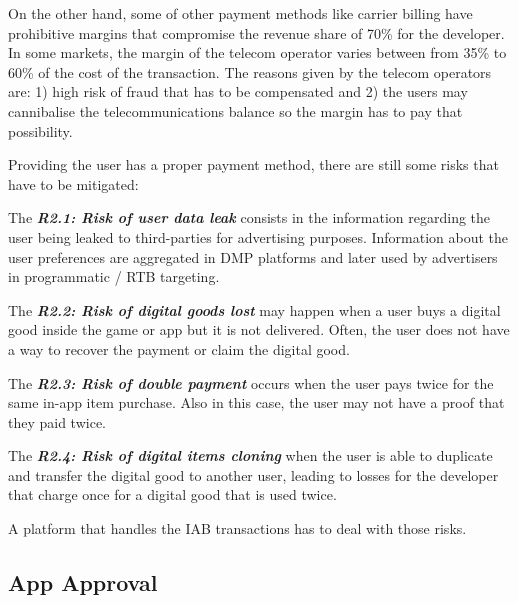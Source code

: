 On the other hand, some of other payment methods like carrier billing have prohibitive margins that compromise the revenue share of 70\% for the developer. In some markets, the margin of the telecom operator varies between from 35\% to 60\% of the cost of the transaction. The reasons given by the telecom operators are: 1) high risk of fraud that has to be compensated and 2) the users may cannibalise the telecommunications balance so the margin has to pay that possibility.


Providing the user has a proper payment method, there are still some risks that have to be mitigated:

\begin{tcolorbox}[enhanced jigsaw,sharp corners, drop fuzzy shadow=ShadowColor]

The {\bf\em R2.1: Risk of user data leak} consists in the information regarding the user being leaked to third-parties for advertising purposes. Information about the user preferences are aggregated in DMP platforms and later used by advertisers in programmatic / RTB targeting.


The {\bf\em R2.2: Risk of digital goods lost} may happen when a user buys a digital good inside the game or app but it is not delivered. Often, the user does not have a way to recover the payment or claim the digital good.

The {\bf\em R2.3: Risk of double payment} occurs when the user pays twice for the same in-app item purchase. Also in this case, the user may not have a proof that they paid twice.

The {\bf\em R2.4: Risk of digital items cloning} when the user is able to duplicate and transfer the digital good to another user, leading to losses for the developer that charge once for a digital good that is used twice.

\end{tcolorbox}

A platform that handles the IAB transactions has to deal with those risks.


\subsection{App Approval}
\label{subsec:intro_approval}


